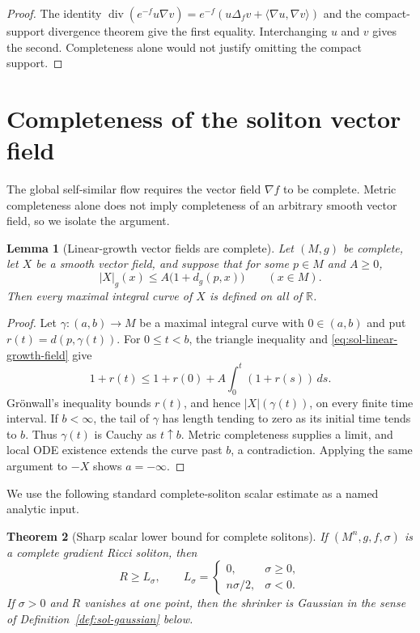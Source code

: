 \documentclass[10pt]{coll-l}
\newtheorem{theorem}{Theorem}[chapter]
\newtheorem{lemma}[theorem]{Lemma}
\theoremstyle{definition}
\theoremstyle{remark}
\numberwithin{section}{chapter}
\numberwithin{equation}{chapter}
\begin{document}
\begin{proof}
The identity
$\operatorname{div}(e^{-f}u\nabla v)
=e^{-f}(u\Delta_fv+\langle\nabla u,\nabla v\rangle)$ and the compact-support
divergence theorem give the first equality.  Interchanging $u$ and $v$
gives the second.  Completeness alone would not justify omitting the compact
support.
\end{proof}

\section{Completeness of the soliton vector field}
\label{sec:sol-completeness}

The global self-similar flow requires the vector field $\nabla f$ to be
complete.  Metric completeness alone does not imply completeness of an
arbitrary smooth vector field, so we isolate the argument.

\begin{lemma}[Linear-growth vector fields are complete]
\label{lem:sol-linear-growth-complete}
Let $(M,g)$ be complete, let $X$ be a smooth vector field, and suppose that
for some $p\in M$ and $A\geq0$,
\begin{equation}
             |X|_g(x)\leq A\bigl(1+d_g(p,x)\bigr)
             \qquad(x\in M).                              \label{eq:sol-linear-growth-field}
\end{equation}
Then every maximal integral curve of $X$ is defined on all of $\mathbb R$.
\end{lemma}

\begin{proof}
Let $\gamma:(a,b)\to M$ be a maximal integral curve with $0\in(a,b)$ and
put $r(t)=d(p,\gamma(t))$.  For $0\leq t<b$, the triangle inequality and
\eqref{eq:sol-linear-growth-field} give
\[
 1+r(t)\leq1+r(0)+A\int_0^t(1+r(s))\,ds.
\]
Gr\"onwall's inequality bounds $r(t)$, and hence $|X|(\gamma(t))$, on every
finite time interval.  If $b<\infty$, the tail of $\gamma$ has length
tending to zero as its initial time tends to $b$.  Thus $\gamma(t)$ is
Cauchy as $t\uparrow b$.  Metric completeness supplies a limit, and local
ODE existence extends the curve past $b$, a contradiction.  Applying the
same argument to $-X$ shows $a=-\infty$.
\end{proof}

We use the following standard complete-soliton scalar estimate as a named
analytic input.

\begin{theorem}[Sharp scalar lower bound for complete solitons]
\label{thm:sol-sharp-scalar-lower}
If $(M^n,g,f,\sigma)$ is a complete gradient Ricci soliton, then
\begin{equation}
 R\geq L_\sigma,\qquad
 L_\sigma=
 \begin{cases}
 0,&\sigma\geq0,\\
 n\sigma/2,&\sigma<0.
 \end{cases}                                             \label{eq:sol-sharp-scalar-lower}
\end{equation}
If $\sigma>0$ and $R$ vanishes at one point, then the shrinker is Gaussian
in the sense of Definition~\ref{def:sol-gaussian} below.
\end{theorem}
\end{document}
